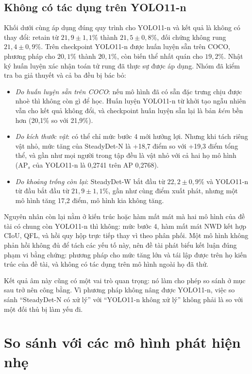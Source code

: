 \subsection{Không có tác dụng trên YOLO11-n}

Khối dưới cùng áp dụng đúng quy trình cho YOLO11-n và kết quả là không có thay đổi: retain từ $21{,}9 \pm 1{,}1\%$ thành $21{,}5 \pm 0{,}8\%$, đối chứng không rung $21{,}4 \pm 0{,}9\%$. Trên checkpoint YOLO11-n được huấn luyện sẵn trên COCO, phương pháp cho $20{,}1\%$ thành $20{,}1\%$, còn biến thể nhất quán cho $19{,}2\%$. Nhật ký huấn luyện xác nhận toán tử rung đã thực sự được áp dụng. Nhóm đã kiểm tra ba giả thuyết và cả ba đều bị bác bỏ:
\begin{itemize}
\item \textit{Do huấn luyện sẵn trên COCO}: nếu mô hình đã có sẵn đặc trưng chịu được nhoè thì không còn gì để học. Huấn luyện YOLO11-n từ khởi tạo ngẫu nhiên vẫn cho kết quả không đổi, và checkpoint huấn luyện sẵn lại là bản \textit{kém} bền hơn (20,1\% so với 21,9\%).
\item \textit{Do kích thước vật}: có thể chỉ mức bước 4 mới hưởng lợi. Nhưng khi tách riêng vật nhỏ, mức tăng của SteadyDet-N là +18,7 điểm so với +19,3 điểm tổng thể, và gần như mọi người trong tập đều là vật nhỏ với cả hai họ mô hình (AP$_s$ của YOLO11-n là 0,2741 trên AP 0,2768).
\item \textit{Do khoảng trống còn lại}: SteadyDet-W bắt đầu từ $22{,}2 \pm 0{,}9\%$ và YOLO11-n từ đầu bắt đầu từ $21{,}9 \pm 1{,}1\%$, gần như cùng điểm xuất phát, nhưng một mô hình tăng 17,2 điểm, mô hình kia không tăng.
\end{itemize}
Nguyên nhân còn lại nằm ở kiến trúc hoặc hàm mất mát mà hai mô hình của đề tài có chung còn YOLO11-n thì không: mức bước 4, hàm mất mát NWD kết hợp CIoU, QFL, và hồi quy hộp trực tiếp thay vì theo phân phối. Một mô hình không phản hồi không đủ để tách các yếu tố này, nên đề tài phát biểu kết luận đúng phạm vi bằng chứng: phương pháp cho mức tăng lớn và tái lập được trên họ kiến trúc của đề tài, và không có tác dụng trên mô hình ngoài họ đã thử.

Kết quả âm này cũng có một vai trò quan trọng: nó làm cho phép so sánh ở mục sau trở nên công bằng. Vì phương pháp không nâng được YOLO11-n, việc so sánh ``SteadyDet-N có xử lý'' với ``YOLO11-n không xử lý'' không phải là so với một đối thủ bị làm yếu đi.

\section{So sánh với các mô hình phát hiện nhẹ}
\label{sec:sosanh}


